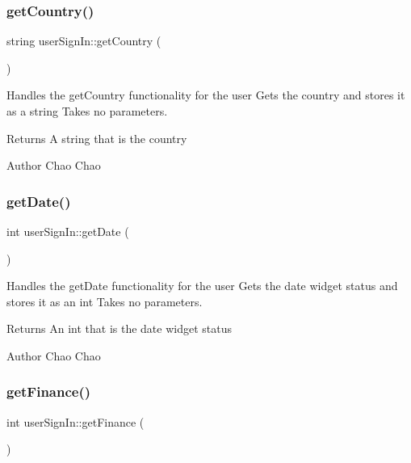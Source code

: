 \subsubsection{\texorpdfstring{get\+Country()}{getCountry()}}
{\footnotesize\ttfamily string user\+Sign\+In\+::get\+Country (\begin{DoxyParamCaption}{ }\end{DoxyParamCaption})}



Handles the get\+Country functionality for the user  Gets the country and stores it as a string  Takes no parameters. 

\begin{DoxyReturn}{Returns}
A string that is the country 
\end{DoxyReturn}
\begin{DoxyAuthor}{Author}
Chao Chao 
\end{DoxyAuthor}
\mbox{\label{classuser_sign_in_ab6980000d41f064c48c751d7ff9a0cd8}} 
\subsubsection{\texorpdfstring{get\+Date()}{getDate()}}
{\footnotesize\ttfamily int user\+Sign\+In\+::get\+Date (\begin{DoxyParamCaption}{ }\end{DoxyParamCaption})}



Handles the get\+Date functionality for the user  Gets the date widget status and stores it as an int  Takes no parameters. 

\begin{DoxyReturn}{Returns}
An int that is the date widget status 
\end{DoxyReturn}
\begin{DoxyAuthor}{Author}
Chao Chao 
\end{DoxyAuthor}
\mbox{\label{classuser_sign_in_a12d39d46c20c4c1af66f5077166d6f24}} 
\subsubsection{\texorpdfstring{get\+Finance()}{getFinance()}}
{\footnotesize\ttfamily int user\+Sign\+In\+::get\+Finance (\begin{DoxyParamCaption}{ }\end{DoxyParamCaption})}



